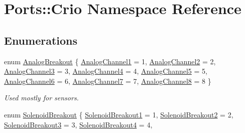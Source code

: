 \hypertarget{namespace_ports_1_1_crio}{\section{\-Ports\-:\-:\-Crio \-Namespace \-Reference}
\label{namespace_ports_1_1_crio}
}
\subsection*{\-Enumerations}
\begin{DoxyCompactItemize}
\item 
enum \hyperlink{namespace_ports_1_1_crio_a7559819d31079e0677b999150af1b1b1}{\-Analog\-Breakout} \{ \*
\hyperlink{namespace_ports_1_1_crio_a7559819d31079e0677b999150af1b1b1a8347b355388c1800c3f9cf2af98f0a85}{\-Analog\-Channel1} =  1, 
\hyperlink{namespace_ports_1_1_crio_a7559819d31079e0677b999150af1b1b1a5f32fa50b449317a8d401a18f9bf3369}{\-Analog\-Channel2} =  2, 
\hyperlink{namespace_ports_1_1_crio_a7559819d31079e0677b999150af1b1b1aa4e451f382c0c6199aa4156cb10d0e9d}{\-Analog\-Channel3} =  3, 
\hyperlink{namespace_ports_1_1_crio_a7559819d31079e0677b999150af1b1b1ab0744ce2599a99c3c8e64ad28e985ded}{\-Analog\-Channel4} =  4, 
\*
\hyperlink{namespace_ports_1_1_crio_a7559819d31079e0677b999150af1b1b1a311a82575261819ac401c1180b5e76f3}{\-Analog\-Channel5} =  5, 
\hyperlink{namespace_ports_1_1_crio_a7559819d31079e0677b999150af1b1b1a013309228793baa3f0545e44e0c0aa83}{\-Analog\-Channel6} =  6, 
\hyperlink{namespace_ports_1_1_crio_a7559819d31079e0677b999150af1b1b1a5420e4fb8eeb5b15081ba27a881e54d6}{\-Analog\-Channel7} =  7, 
\hyperlink{namespace_ports_1_1_crio_a7559819d31079e0677b999150af1b1b1a1abd070d1aadd566432dd6d5634898d9}{\-Analog\-Channel8} =  8
 \}
\begin{DoxyCompactList}\small\item\em \-Used mostly for sensors. \end{DoxyCompactList}\item 
enum \hyperlink{namespace_ports_1_1_crio_a22e0c5a7a7529735b35a09e0f727cf72}{\-Solenoid\-Breakout} \{ \*
\hyperlink{namespace_ports_1_1_crio_a22e0c5a7a7529735b35a09e0f727cf72a181a6908fe679da81a31f2ad2abc0e3c}{\-Solenoid\-Breakout1} =  1, 
\hyperlink{namespace_ports_1_1_crio_a22e0c5a7a7529735b35a09e0f727cf72a5f5ed79a81f6e79ce43fb862b2e8ea07}{\-Solenoid\-Breakout2} =  2, 
\hyperlink{namespace_ports_1_1_crio_a22e0c5a7a7529735b35a09e0f727cf72a746b73e20e67c5a5c9778a3d6aaa6312}{\-Solenoid\-Breakout3} =  3, 
\hyperlink{namespace_ports_1_1_crio_a22e0c5a7a7529735b35a09e0f727cf72a756522c9c61ac6a7109841ce94ef925d}{\-Solenoid\-Breakout4} =  4, 

\end{DoxyCompactItemize}
